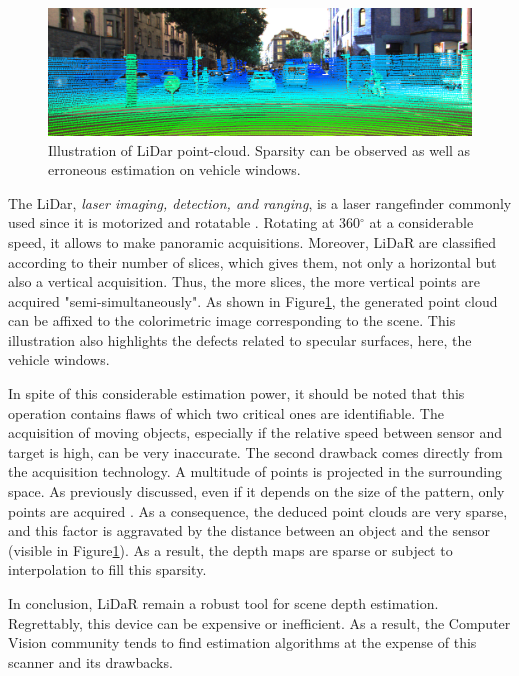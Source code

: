 \begin{figure}[h]
	\centering
	\includegraphics[width=0.8\linewidth]{Figures/SOA/lidar-ill}
	\caption[Illustration of LiDar point-cloud.]{Illustration of LiDar point-cloud\footnotemark. Sparsity can be observed as well as erroneous estimation on vehicle windows.}
	\label{lidar-ill}
\end{figure}



The LiDar, \emph{laser imaging, detection, and ranging}, is a laser rangefinder commonly used since it is motorized and rotatable \cite{wang20133d}. Rotating at 360$^\circ$ at a considerable speed, it allows to make panoramic acquisitions. Moreover, LiDaR are classified according to their number of slices, which gives them, not only a horizontal but also a vertical acquisition. Thus, the more slices, the more vertical points are acquired "semi-simultaneously".
As shown in Figure\ref{lidar-ill}, the generated point cloud can be affixed to the colorimetric image corresponding to the scene. This illustration also highlights the defects related to specular surfaces, here, the vehicle windows.

In spite of this considerable estimation power, it should be noted that this operation contains flaws of which two critical ones are identifiable. The acquisition of moving objects, especially if the relative speed between sensor and target is high, can be very inaccurate. The second drawback comes directly from the acquisition technology. A multitude of points is projected in the surrounding space. As previously discussed, even if it depends on the size of the pattern, only points are acquired \cite{vaze2007high}. As a consequence, the deduced point clouds are very sparse, and this factor is aggravated by the distance between an object and the sensor (visible in Figure\ref{lidar-ill}). As a result, the depth maps are sparse or subject to interpolation to fill this sparsity.

In conclusion, LiDaR remain a robust tool for scene depth estimation. Regrettably, this device can be expensive or inefficient. As a result, the Computer Vision community tends to find estimation algorithms at the expense of this scanner and its drawbacks.

